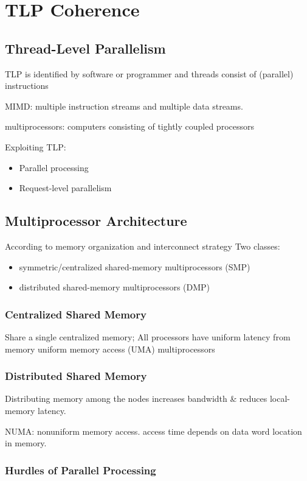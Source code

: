 \newpage
\section{TLP Coherence}

\subsection{Thread-Level Parallelism}
TLP is identified by software or programmer and threads consist of (parallel) instructions

MIMD: multiple instruction streams and multiple data streams. 


multiprocessors: computers consisting of tightly coupled processors

Exploiting TLP:
\begin{itemize}
    \item Parallel processing
    \item Request-level parallelism
\end{itemize}

\subsection{Multiprocessor Architecture}
According to memory organization and interconnect strategy
Two classes:
\begin{itemize}
    \item symmetric/centralized shared-memory multiprocessors (SMP)
    \item distributed shared-memory multiprocessors (DMP)
\end{itemize}

\subsubsection{Centralized Shared Memory}
Share a single centralized memory; All processors have uniform latency from memory uniform memory access (UMA) multiprocessors


\subsubsection{Distributed Shared Memory}
Distributing memory among the nodes increases bandwidth \& reduces local-memory latency. 

NUMA: nonuniform memory access. access time depends on data word location in memory. 

\subsubsection{Hurdles of Parallel Processing}

